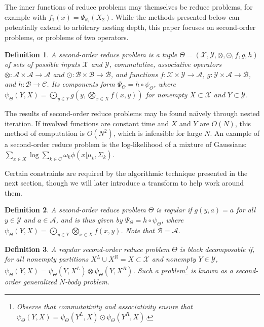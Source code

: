 \documentclass{article}
\newtheorem{definition} {Definition}
\newcommand{\GNP}[1][\psi]{{#1}_{\Theta}}
\newcommand{\comp}{\mathbin{\circ}}
\begin{document}
The inner functions of reduce problems may themselves be reduce
problems, for example with $f_1(x) = \Psi_{\theta_2}(X_2)$.  While the
methods presented below can potentially extend to arbitrary nesting
depth, this paper focuses on second-order problems, or problems of two
operators.
\begin{definition}
  A {\em second-order reduce problem} is a tuple $\Theta =
  (\mathcal{X},\mathcal{Y},\otimes,\odot,f,g,h)$ of sets of possible
  inputs $\mathcal{X}$ and $\mathcal{Y}$, commutative, associative
  operators $\otimes \colon \mathcal{A} \times \mathcal{A} \to
  \mathcal{A}$ and $\odot \colon \mathcal{B} \times \mathcal{B} \to
  \mathcal{B}$, and functions $f \colon \mathcal{X} \times \mathcal{Y}
  \to \mathcal{A}$, $g \colon \mathcal{Y} \times \mathcal{A} \to
  \mathcal{B}$, and $h \colon \mathcal{B} \to \mathcal{C}$.  Its
  components form $\Psi_{\Theta} = h \comp \psi_{\Theta}$, where
  $\psi_{\Theta}(Y,X) = \bigodot_{y \in Y} g \left( y,\bigotimes_{x
  \in X} f(x,y) \right)$ for nonempty $X \subset \mathcal{X}$ and $Y
  \subset \mathcal{Y}$.
\end{definition}
\noindent The results of second-order reduce problems may be found
na\"{\i}vely through nested iteration.  If involved functions are
constant time and $X$ and $Y$ are $O(N)$, this method of computation
is $O(N^2)$, which is infeasible for large $N$.  An example of a
second-order reduce problem is the log-likelihood of a mixture of
Gaussians: $\sum_{x \in X} \log \sum_{k \in C} \omega_k \phi(x |
\mu_k, \Sigma_k)$.

Certain constraints are required by the algorithmic technique
presented in the next section, though we will later introduce a
transform to help work around them.
\begin{definition}
  A second-order reduce problem $\Theta$ is {\em regular} if $g(y,a) =
  a$ for all $y \in \mathcal{Y}$ and $a \in \mathcal{A}$, and is thus
  given by $\Psi_{\Theta} = h \comp \psi_{\Theta}$, where
  $\psi_{\Theta}(Y,X) = \bigodot_{y \in Y} \bigotimes_{x \in X}
  f(x,y)$.  Note that $\mathcal{B} = \mathcal{A}$.
\end{definition}
\begin{definition}
  A regular second-order reduce problem $\Theta$ is {\em block
  decomposable} if, for all nonempty partitions $X^{\!L} \cup X^{\!R} = X
  \subset \mathcal{X}$ and nonempty $Y \in \mathcal{Y}$, $\GNP(Y,X) =
  \GNP(Y,X^{\!L}) \otimes \GNP(Y,X^{\!R})$.  Such a problem\footnote{Observe
  that commutativity and associativity ensure that $\GNP(Y,X) =
  \GNP(Y^{\!L},X) \odot \GNP(Y^{\!R},X)$.} is known as a {\em second-order
  generalized $N$-body problem}.
\end{definition}
\end{document}
